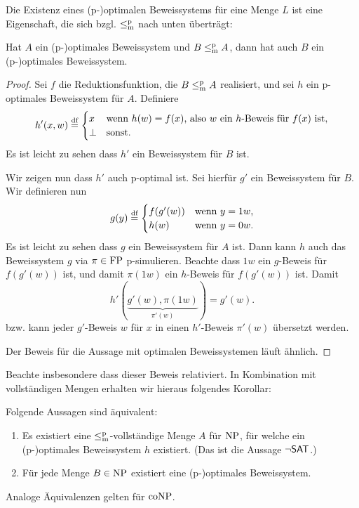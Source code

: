 Die Existenz eines (p-)optimalen Beweissystems für eine Menge $L$ ist eine Eigenschaft, die sich bzgl. $\leq_\mathrm{m}^\mathrm{p}$ nach unten überträgt:
\begin{lemma}\label{lemma:optimal-downward}
    Hat $A$ ein (p-)optimales Beweissystem und $B\leq_\mathrm{m}^\mathrm{p} A$, dann hat auch $B$ ein (p-)optimales Beweissystem.
\end{lemma}
\begin{proof}
    \strut{} Sei $f$ die Reduktionsfunktion, die $B\leq_\mathrm{m}^\mathrm{p} A$ realisiert, und 
    sei $h$ ein p-optimales Beweissystem für $A$. Definiere
    \[ h'(x,w) \stackrel{\text{df}}{=} \begin{cases} x & \text{wenn $h(w)=f(x)$, also $w$ ein $h$-Beweis für $f(x)$ ist},\\ \bot & \text{sonst.} \end{cases} \]
    Es ist leicht zu sehen dass $h'$ ein Beweissystem für $B$ ist.

    Wir zeigen nun dass $h'$ auch p-optimal ist. Sei hierfür $g'$ ein Beweissystem für $B$. Wir definieren nun
    \[ g(y) \stackrel{\text{df}}{=} \begin{cases} f(g'(w)) & \text{wenn $y=1w$,}\\ h(w) & \text{wenn $y=0w$.} \end{cases}\]
    Es ist leicht zu sehen dass $g$ ein Beweissystem für $A$ ist. Dann kann $h$ auch das Beweissystem $g$ via $\pi\in\mathrm{FP}$ p-simulieren.
    Beachte dass $1w$ ein $g$-Beweis für $f(g'(w))$ ist, und damit $\pi(1w)$ ein $h$-Beweis für $f(g'(w))$ ist.
    Damit
    \[ h'(\underbrace{g'(w), \pi(1w)}_{\pi'(w)}) = g'(w). \]
    bzw. kann jeder $g'$-Beweis $w$ für $x$ in einen $h'$-Beweis $\pi'(w)$ übersetzt werden.

    Der Beweis für die Aussage mit optimalen Beweissystemen läuft ähnlich.
\end{proof}
Beachte insbesondere dass dieser Beweis relativiert.
In Kombination mit vollständigen Mengen erhalten wir hieraus folgendes Korollar:
\begin{corollary}
    Folgende Aussagen sind äquivalent:
    \begin{enumerate}
        \item Es existiert eine $\leq_\mathrm{m}^\mathrm{p}$-vollständige Menge $A$ für $\mathrm{NP}$, für welche ein (p-)optimales Beweissystem $h$ existiert. (Das ist die Aussage $\neg\mathsf{SAT}$.)
        \item Für jede Menge $B\in\mathrm{NP}$ existiert eine (p-)optimales Beweissystem.
    \end{enumerate}
    Analoge Äquivalenzen gelten für $\mathrm{coNP}$.
\end{corollary}

